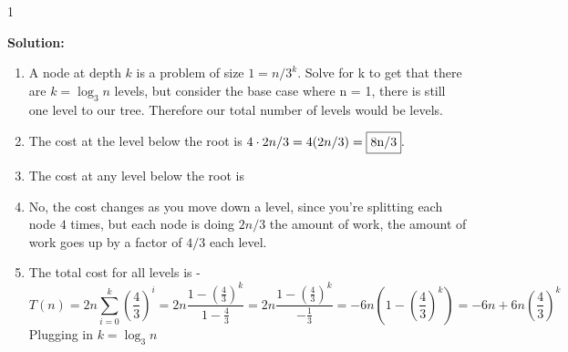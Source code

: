 \documentclass[9pt]{article}
\def\solutions{1}
\newcommand{\ben}{\begin{enumerate}}
\newcommand{\lp}{\left(}
\newcommand{\rp}{\right)}
\begin{document}

\if\solutions1
\vspace{2mm}

\textbf{Solution:} \\
\ben
  \item A node at depth $k$ is a problem of size $1 = n/3^k$. Solve for k to get that there are $k= \log_3{n}$ levels, but consider the base case where n = 1, there is still one level to our tree. Therefore our total number of levels would be  levels. 
  \item The cost at the level below the root is $4 \cdot 2n/3 = 4(2n/3) = \fbox{8n/3}.$
  \item The cost at any level below the root is 
  \item No, the cost changes as you move down a level, since you're splitting each node $4$ times, but each node is doing $2n/3$ the amount of work, the amount of work goes up by a factor of $4/3$ each level.
  \item The total cost for all levels is - 
        $$T(n) = 2n \sum_{i=0}^k(\frac{4}{3})^i = 2n \frac{1- \lp \frac{4}{3} \rp ^k}{1- \frac{4}{3}} = 2n \frac{1- \lp \frac{4}{3} \rp ^k}{-\frac{1}{3}} = -6n \lp 1- \lp \frac{4}{3} \rp ^k \rp = - 6n + 6n \lp \frac{4}{3} \rp ^k $$
        Plugging in $k = \log_3 n$


\end{enumerate}
\end{document}
